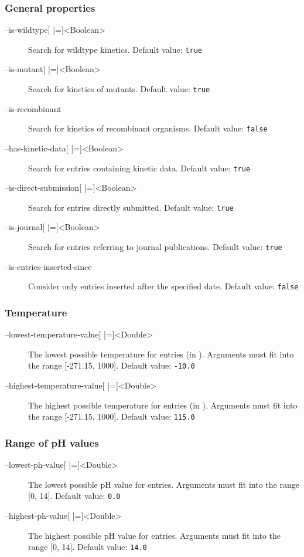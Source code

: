 \subsubsection{General properties}
\begin{description}
\item[--is-wildtype{[} |={]}<Boolean>]
  Search for wildtype kinetics.
  Default value: \texttt{true}

\item[--is-mutant{[} |={]}<Boolean>]
  Search for kinetics of mutants.
  Default value: \texttt{true}

\item[--is-recombinant]
  Search for kinetics of recombinant organisms.
  Default value: \texttt{false}

\item[--has-kinetic-data{[} |={]}<Boolean>]
  Search for entries containing kinetic data.
  Default value: \texttt{true}

\item[--is-direct-submission{[} |={]}<Boolean>]
  Search for entries directly submitted.
  Default value: \texttt{true}

\item[--is-journal{[} |={]}<Boolean>]
  Search for entries referring to journal publications.
  Default value: \texttt{true}

\item[--is-entries-inserted-since]
  Consider only entries inserted after the specified date.
  Default value: \texttt{false}
\end{description}

\subsubsection{Temperature}
\begin{description}
\item[--lowest-temperature-value{[} |={]}<Double>]
  The lowest possible temperature for entries (in \textcelsius).
  Arguments must fit into the range {[}-271.15, 1000{]}.
  Default value: \texttt{-10.0}

\item[--highest-temperature-value{[} |={]}<Double>]
  The highest possible temperature for entries (in \textcelsius).
  Arguments must fit into the range {[}-271.15, 1000{]}.
  Default value: \texttt{115.0}
\end{description}

\subsubsection{Range of pH values}
\begin{description}
\item[--lowest-ph-value{[} |={]}<Double>]
  The lowest possible pH value for entries.
  Arguments must fit into the range {[}0, 14{]}.
  Default value: \texttt{0.0}

\item[--highest-ph-value{[} |={]}<Double>]
  The highest possible pH value for entries.
  Arguments must fit into the range {[}0, 14{]}.
  Default value: \texttt{14.0}
\end{description}

